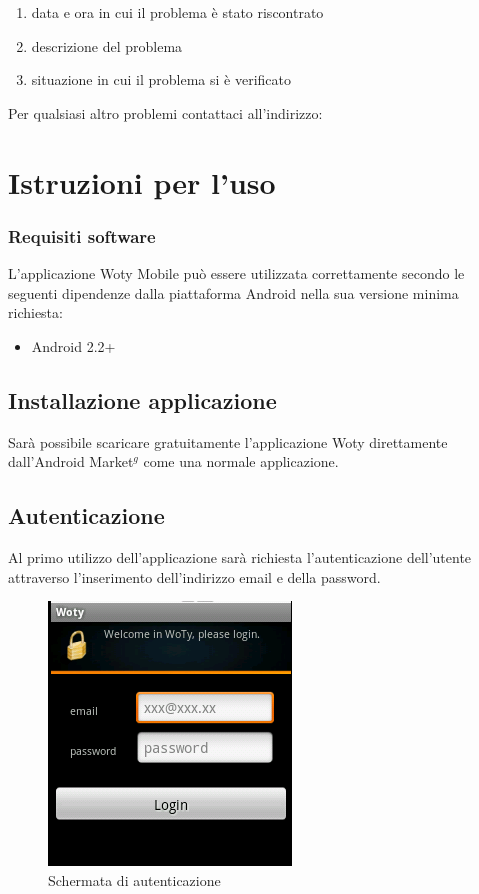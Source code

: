 \begin{enumerate}
\item data e ora in cui il problema è stato riscontrato
\item descrizione del problema
\item situazione in cui il problema si è verificato
\end{enumerate}


Per qualsiasi altro problemi contattaci all'indirizzo: 



\newpage



\section{Istruzioni per l'uso}

\subsubsection{Requisiti software}
L'applicazione Woty Mobile può essere utilizzata correttamente secondo le seguenti dipendenze dalla piattaforma Android nella sua versione minima richiesta:

\begin{itemize}
\item Android 2.2+
\end{itemize}


\subsection{Installazione applicazione}
Sarà possibile scaricare gratuitamente l'applicazione Woty direttamente dall'Android Market$^g$ come una normale applicazione.

\subsection{Autenticazione}
Al primo utilizzo dell'applicazione sarà richiesta l'autenticazione dell'utente attraverso l'inserimento dell'indirizzo email e della password. 

\begin{center}
\begin{figure}[ht]
\centering
\includegraphics[scale=0.55]{images/login.png}
\caption{ Schermata di autenticazione }
\end{figure}
\end{center}


